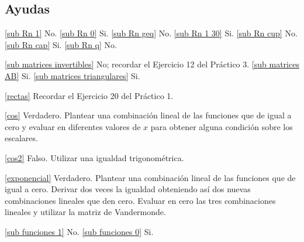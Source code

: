 \documentclass[12pt]{amsart}
\begin{document}
\begin{enumerate}[resume]
\begin{enumerate}
	\end{enumerate}


\end{enumerate}

%
%
%
%
%
% 		
%

\subsection*{Ayudas}

\eqref{sub Rn 1} No. \eqref{sub Rn 0} Si. \eqref{sub Rn geq} No. \eqref{sub Rn 1 30} Si. \eqref{sub Rn cup} No. \eqref{sub Rn cap} Si. \eqref{sub Rn q} No.


\eqref{sub matrices invertibles} No; recordar el Ejercicio 12 del Pr\'actico 3. \eqref{sub matrices AB} Si. \eqref{sub matrices triangulares} Si.

\eqref{rectas} Recordar el Ejercicio 20 del Pr\'actico 1.

\eqref{cos} Verdadero. Plantear una combinaci\'on lineal de las funciones que de igual a cero y evaluar en diferentes valores de $x$ para obtener alguna condici\'on sobre los escalares.

\eqref{cos2} Falso. Utilizar una igualdad trigonom\'etrica.

\eqref{exponencial} Verdadero. Plantear una combinaci\'on lineal de las funciones que de igual a cero. Derivar dos veces la igualdad obteniendo as\'i dos nuevas combinaciones lineales que den cero. Evaluar en cero las tres combinaciones lineales y utilizar la matriz de Vandermonde.

\eqref{sub funciones 1} No. \eqref{sub funciones 0} Si.
\end{document}
